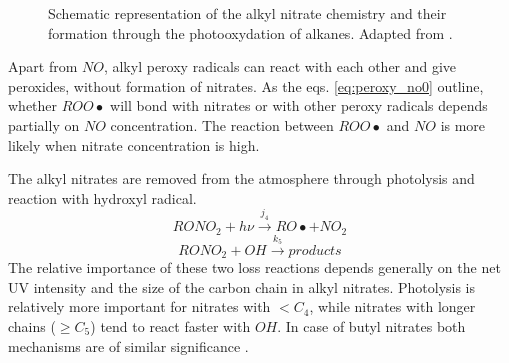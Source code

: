 \documentclass[11pt,a4paper]{article}
\begin{document}
\begin{figure}[h]
\centering
{}
\caption{Schematic representation of the alkyl nitrate chemistry and their formation through the photooxydation of alkanes. Adapted from \citep{Bertman1995}.}
\label{fig:scheme_bertman}
\end{figure}

Apart from $NO$, alkyl peroxy radicals can react with each other and give peroxides, without formation of nitrates. As the eqs. \eqref{eq:peroxy_no0} outline, whether $ROO\bullet$ will bond with nitrates or with other peroxy radicals depends partially on $NO$ concentration. The reaction between $ROO\bullet$ and $NO$ is more likely when nitrate concentration is high.

The alkyl nitrates are removed from the atmosphere through photolysis and reaction with hydroxyl radical.
\begin{equation} \label{eq:an_photo}
RONO_2 + h\nu \xrightarrow{j_4} RO\bullet + NO_2
\end{equation}
\begin{equation} \label{eq:an_oh}
RONO_2 + OH \xrightarrow{k_5} \mathit{products}
\end{equation}
The relative importance of these two loss reactions depends generally on the net UV intensity and the size of the carbon chain in alkyl nitrates. Photolysis is relatively more important for nitrates with $< C_4$, while nitrates with longer chains ($\geq C_5$) tend to react faster with $OH$. In case of butyl nitrates both mechanisms are of similar significance \citep{Worton2010}.
\end{document}
